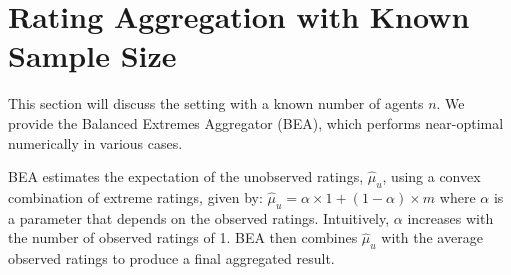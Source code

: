 \section{Rating Aggregation with Known Sample Size}
\label{sec:known}
This section will discuss the setting with a known number of agents $n$. We provide the Balanced Extremes Aggregator (BEA), which performs near-optimal numerically in various cases. 


BEA estimates the expectation of the unobserved ratings, \(\hat{\mu}_u\), using a convex combination of extreme ratings, given by: $\hat{\mu}_u = \alpha \times 1 + (1-\alpha) \times m$ where \(\alpha\) is a parameter that depends on the observed ratings. Intuitively, \(\alpha\) increases with the number of observed ratings of 1. BEA then combines \(\hat{\mu}_u\) with the average observed ratings to produce a final aggregated result. 

\begin{comment}
\begin{figure}[h]
  \centering
  \texttt{[image: picture/N=20.pdf]}
  \caption{Regret of different aggregators, $n=20$. The x-axis is the lower bound of the participation probability $q$ and the y-axis is the natural logarithm of the regret. The regret of BEA almost reaches the theoretical lower bound.}
  \label{fig:N=20}
\end{figure}

\begin{figure}[h]
  \centering
  \texttt{[image: picture/N=10.pdf]}
  \caption{Regret of different aggregators, $n=10$.}
  \label{fig:N=10}
\end{figure}
\end{comment}





